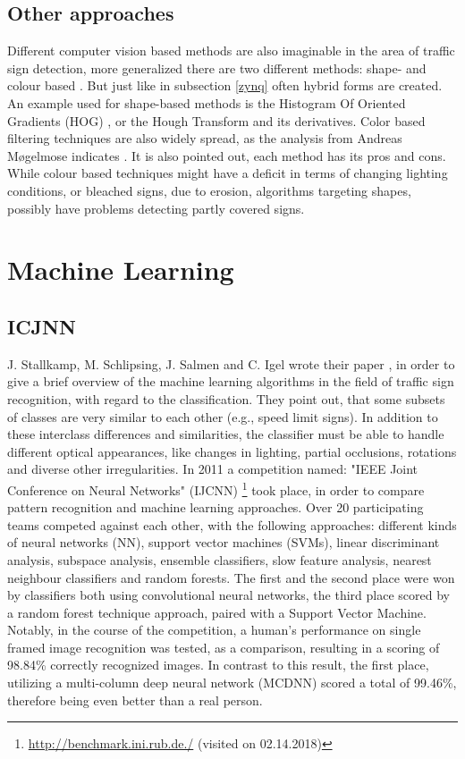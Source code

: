 \subsection{Other approaches}
Different computer vision based methods are also imaginable in the area of traffic sign detection, more generalized there are two different methods: shape- and colour based \cite{moglemose}. But just like in subsection \ref{zynq} often hybrid forms are created. An example used for shape-based methods is the Histogram Of Oriented Gradients (HOG) \cite{hogex}, or the Hough Transform and its derivatives. Color based filtering techniques are also widely spread, as the analysis from Andreas Møgelmose indicates \cite{moglemose}. 
It is also pointed out, each method has its pros and cons. While colour based techniques might have a deficit in terms of changing lighting conditions, or bleached signs, due to erosion, algorithms targeting shapes, possibly have problems detecting partly covered signs. 


\section{Machine Learning}
\subsection{ICJNN}\label{ssec:machinelearning}

J. Stallkamp, M. Schlipsing, J. Salmen and C. Igel wrote their paper \cite{machinelearning}, in order to give a brief overview of the machine learning algorithms in the field of traffic sign recognition, with regard to the classification. \newline
They point out, that some subsets of classes are
very similar to each other (e.g., speed limit signs). In addition to these interclass differences and similarities, the classifier must be able to handle different optical appearances, like changes in lighting, partial occlusions, rotations and diverse other irregularities. In 2011 a competition named: "IEEE Joint
Conference on Neural Networks" (IJCNN) \footnote{\url{http://benchmark.ini.rub.de./} (visited on 02.14.2018)} took place, in order to compare pattern recognition and machine learning approaches. Over 20 participating teams competed against each other, with the following approaches: different kinds of neural
networks (NN), support vector machines (SVMs), linear discriminant analysis, subspace analysis, ensemble classifiers, slow feature analysis, nearest neighbour classifiers and random forests. \newline
The first and the second place were won by classifiers both using convolutional neural networks, the third place scored by a random forest technique approach, paired with a Support Vector Machine. Notably, in the course of the competition, a human's performance on single framed image recognition was tested, as a comparison, resulting in a scoring of 98.84\% correctly recognized images. In contrast to this result, the first place, utilizing a multi-column deep neural network (MCDNN) scored a total of 99.46\%, therefore being even better than a real person. 


